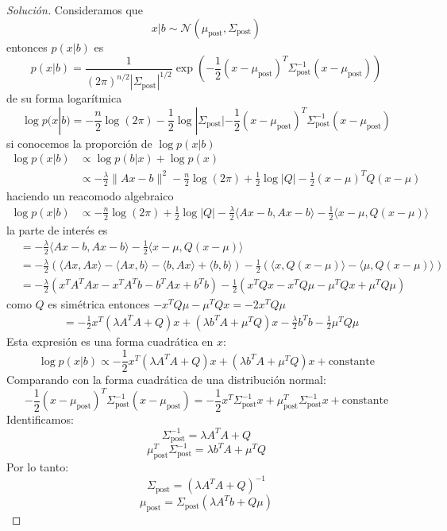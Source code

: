\documentclass[12pt,spanish,mexico]{article}
\numberwithin{equation}{section}
\theoremstyle{definition}
\theoremstyle{remark}
\newenvironment{solution}{\begin{proof}[Solución]}{\end{proof}}
\begin{document}
\begin{enumerate}
\begin{solution}
Consideramos que 
\[
x|b \sim \mathcal{N}(\mu_{\text{post}}, \Sigma_{\text{post}})
\]
entonces $p(x|b)$ es
\[
p(x|b)=\frac{1}{(2\pi)^{n/2}|\Sigma_{\text{post}}|^{1/2}}\exp\left(-\frac{1}{2}(x-\mu_{\text{post}})^T \Sigma_{\text{post}}^{-1} (x-\mu_{\text{post}})\right)
\]
de su forma logarítmica
\[
\log p(x|b)=-\frac{n}{2}\log(2\pi)-\frac{1}{2}\log|\Sigma_{\text{post}}|-\frac{1}{2}(x-\mu_{\text{post}})^T \Sigma_{\text{post}}^{-1} (x-\mu_{\text{post}})
\]
si conocemos la proporción de $\log p(x|b)$
\begin{align*}
\log p(x|b) &\propto \log p(b|x)+ \log p(x) \\
&\propto -\frac{\lambda}{2}\|Ax-b\|^2 -\frac{n}{2} \log(2\pi)+ \frac{1}{2}\log|Q| -\frac{1}{2}(x-\mu)^T Q (x-\mu)
\end{align*}
haciendo un reacomodo algebraico
\begin{align*}
\log p(x|b) &\propto -\frac{n}{2} \log(2\pi)+ \frac{1}{2}\log|Q|-\frac{\lambda}{2} \langle Ax-b, Ax-b\rangle-\frac{1}{2} \langle x-\mu,Q (x-\mu)\rangle
\end{align*}
la parte de interés es 
\begin{align*}
&=-\frac{\lambda}{2} \langle Ax-b, Ax-b\rangle-\frac{1}{2} \langle x-\mu,Q (x-\mu)\rangle \\
&=-\frac{\lambda}{2} \left(\langle Ax, Ax\rangle-\langle Ax, b\rangle-\langle b, Ax\rangle +\langle b, b\rangle\right)-\frac{1}{2}\left(\langle x,Q (x-\mu)\rangle-\langle \mu,Q (x-\mu)\rangle \right)\\
&=-\frac{\lambda}{2} \left( x^T A^T A x - x^T A^T b - b^T A x + b^T b \right)-\frac{1}{2}\left(x^T Q x - x^T Q \mu - \mu^T Q x +\mu^T Q \mu \right)
\end{align*}
como $Q$ es simétrica entonces $- x^T Q \mu - \mu^T Q x = -2 x^T Q \mu$
\begin{align*}
&= -\frac{1}{2} x^T (\lambda A^T A + Q) x + (\lambda b^T A + \mu^T Q) x - \frac{\lambda}{2}b^T b - \frac{1}{2}\mu^T Q \mu
\end{align*}
Esta expresión es una forma cuadrática en $x$:
\[
\log p(x|b) \propto -\frac{1}{2} x^T (\lambda A^T A + Q) x + (\lambda b^T A + \mu^T Q) x + \text{constante}
\]
Comparando con la forma cuadrática de una distribución normal:
\[
-\frac{1}{2} (x-\mu_{\text{post}})^T \Sigma_{\text{post}}^{-1} (x-\mu_{\text{post}}) = -\frac{1}{2} x^T \Sigma_{\text{post}}^{-1} x + \mu_{\text{post}}^T \Sigma_{\text{post}}^{-1} x + \text{constante}
\]
Identificamos:
\[
\Sigma_{\text{post}}^{-1} = \lambda A^T A + Q
\]
\[
\mu_{\text{post}}^T \Sigma_{\text{post}}^{-1} = \lambda b^T A + \mu^T Q
\]
Por lo tanto:
\[
\Sigma_{\text{post}} = (\lambda A^T A + Q)^{-1}
\]
\[
\mu_{\text{post}} = \Sigma_{\text{post}} (\lambda A^T b + Q \mu)
\]


\end{solution}
\end{enumerate}
\end{document}
